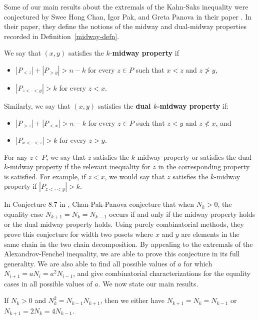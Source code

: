 \documentclass{puthesis-UG}
\begin{document}
Some of our main results about the extremals of the Kahn-Saks inequality were conjectured by Swee Hong Chan, Igor Pak, and Greta Panova in their paper \cite{chan2022extensions}. In their paper, they define the notions of the midway and dual-midway properties recorded in Definition~\ref{midway-defn}.
\begin{defn} \label{midway-defn}
	We say that $(x, y)$ satisfies the $k$-\textbf{midway property} if 
	\begin{itemize}
		\item $|P_{< z}| + |P_{>y}| > n-k$ for every $z \in P$ such that $x < z$ and $z \not > y$, 
		\item $|P_{z < \cdot < y}| > k$ for every $z < x$. 
	\end{itemize}
	Similarly, we say that $(x, y)$ satisfies the \textbf{dual $k$-midway property} if:
	\begin{itemize}
		\item $|P_{> z}| + |P_{<x}| > n-k$ for every $z \in P$ such that $z < y$ and $z \not < x$, and 
		\item $|P_{x < \cdot < z}| > k$ for every $z > y$. 
	\end{itemize}
	For any $z \in P$, we say that $z$ satisfies the $k$-midway property or satisfies the dual $k$-midway property if the relevant inequality for $z$ in the corresponding property is satisfied. For example, if $z < x$, we would say that $z$ satisfies the $k$-midway property if $|P_{z < \cdot < y}| > k$. 
\end{defn}
In Conjecture 8.7 in \cite{chan2022extensions}, Chan-Pak-Panova conjecture that when $N_k > 0$, the equality case $N_{k+1} = N_k = N_{k-1}$ occurs if and only if the midway property holds or the dual midway property holds. Using purely combinatorial methods, they prove this conjecture for width two posets where $x$ and $y$ are elements in the same chain in the two chain decomposition. By appealing to the extremals of the Alexandrov-Fenchel inequality, we are able to prove this conjecture in its full generality. We are also able to find all possible values of $a$ for which $N_{i+1} = aN_i = a^2 N_{i-1}$, and give combinatorial characterizations for the equality cases in all possible values of $a$. We now state our main results. 

\begin{thm} \label{kahn-saks-thm-1}
	If $N_k > 0$ and $N_k^2 = N_{k-1} N_{k+1}$, then we either have $N_{k+1} = N_k = N_{k-1}$ or $N_{k+1} = 2N_k = 4N_{k-1}$. 
\end{thm}
\end{document}

